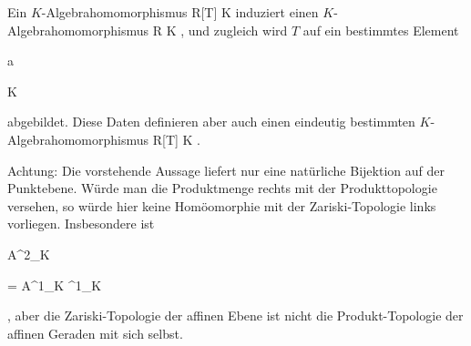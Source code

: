 {


Ein $K$-Algebrahomomorphismus
\maabb {} {R[T] } { K
} {}
induziert einen $K$-Al\-gebrahomomorphismus
\maabb {} { R } { K
} {,}
und zugleich wird $T$ auf ein bestimmtes Element


\mavergleichskette

{\vergleichskette

{ a
}

{ \in }{ K
}

{  }{
}

{    }{
}

{   }{
}

}
{}{}{}
abgebildet. Diese Daten definieren aber auch einen eindeutig bestimmten $K$-Algebrahomomorphismus
\maabb {} {R[T] } { K
} {.}


}


Achtung: Die vorstehende Aussage liefert nur eine natürliche Bijektion auf der Punktebene. Würde man die Produktmenge rechts mit der Produkttopologie versehen, so würde hier keine Homöomorphie mit der Zariski-Topologie links vorliegen. Insbesondere ist


\mavergleichskette

{\vergleichskette

{ {\mathbb A}^{2}_{K}
}

{ = }{ {\mathbb A}^{1}_{K} ^{1}_{K}
}

{  }{
}

{    }{
}

{   }{
}

}
{}{}{,}
aber die Zariski-Topologie der affinen Ebene ist nicht die Produkt-Topologie der affinen Geraden mit sich selbst.



{}

